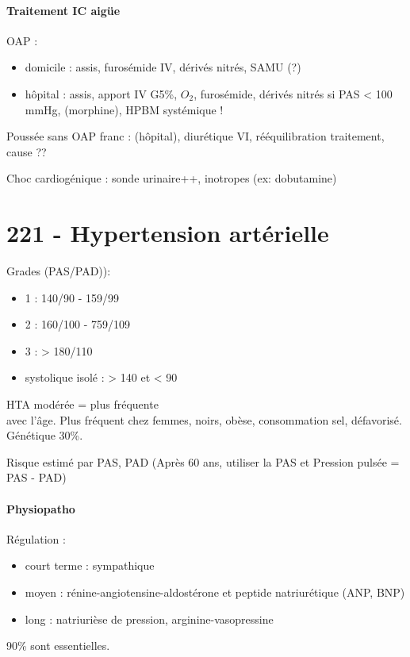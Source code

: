 \paragraph{Traitement IC aigüe}
OAP : 
\begin{itemize}
  \item domicile : assis, furosémide IV, dérivés nitrés, SAMU (?)
  \item hôpital : assis, apport IV G5\%, $O_2$, furosémide, dérivés nitrés si
    PAS < 100 mmHg, (morphine), HPBM systémique !
\end{itemize}
Poussée sans OAP franc : (hôpital), diurétique VI, rééquilibration traitement,
cause ??

Choc cardiogénique : sonde urinaire++, inotropes (ex: dobutamine)



\section{221 - Hypertension artérielle}%
\label{sec:221_hypertension_arterielle}
Grades (\gls{PAS}/\gls{PAD})):
\begin{itemize}
  \item 1 : 140/90 - 159/99
  \item 2 : 160/100 - 759/109
  \item 3 : > 180/110
  \item systolique isolé : > 140 et < 90
\end{itemize}

HTA modérée = plus fréquente\\
\inc avec l'âge. Plus fréquent chez femmes, noirs, obèse, consommation sel,
défavorisé. Génétique 30\%.

Risque estimé par PAS, PAD (Après 60 ans, utiliser la PAS et Pression pulsée = PAS - PAD)

\paragraph{Physiopatho}
Régulation :
\begin{itemize}
  \item court terme : sympathique 
  \item moyen : rénine-angiotensine-aldostérone et peptide natriurétique (ANP,
    BNP)
  \item long : natriurièse de pression, arginine-vasopressine
\end{itemize}

90\% sont essentielles.

